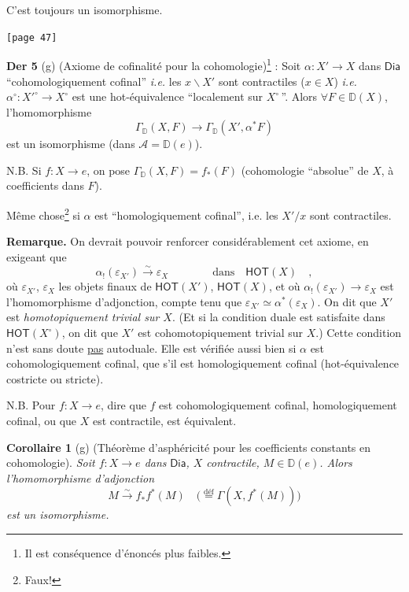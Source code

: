 \documentclass[11pt]{article}
\newcommand{\printedpage}[1]{\marginpar{\footnotesize p.~#1}}
\newcommand{\msp}[1]{\marginpar{\footnotesize [#1]}}
\newcommand{\Dia}{\mathsf{Dia}}
\newcommand{\D}{\mathbb{D}}
\newcommand{\HOT}{\mathsf{HOT}}
\begin{document}
\noindent C'est toujours un isomorphisme.

\noindent\msp{page 47}\texttt{[page 47]}

\noindent\textbf{Der 5} (g) (Axiome de cofinalité pour la cohomologie)\footnote[14]{Il est conséquence d'énoncés plus faibles.} : Soit $\alpha : X' \to X$ dans $\Dia$ “cohomologiquement cofinal” \textit{i.e.} les $x\backslash X'$ sont contractiles ($x \in X$) \textit{i.e.} $\alpha^{\circ} : {X'}^{\circ} \to X^{\circ}$ est une hot-équivalence “localement sur $X^{\circ}$\,”. Alors $\forall F \in \D(X)$, l'homomorphisme
\[ \Gamma_{\D}(X, F) \longrightarrow \Gamma_{\D}(X', \alpha^{*} F) \]
est un isomorphisme (dans $\mathcal{A} = \D(e)$).

\noindent N.B. Si $f : X \to e$, on pose $\Gamma_{\D}(X, F) = f_{*}(F)$ (cohomologie “absolue” de $X$, à coefficients dans $F$).

\noindent Même chose\footnote[15]{Faux!} si $\alpha$ est “homologiquement cofinal”, i.e. les $X'/x$ sont contractiles.


\printedpage{26}

\noindent\textbf{Remarque.} On devrait pouvoir renforcer considérablement cet axiome, en exigeant que
\[ \alpha_{!}(\varepsilon_{X'}) \xrightarrow{\sim} \varepsilon_{X} \qquad\qquad \text{dans} \quad \HOT(X) \quad , \]
où $\varepsilon_{X'}$, $\varepsilon_{X}$ les objets finaux de $\HOT(X')$, $\HOT(X)$, et où $\alpha_{!}(\varepsilon_{X'}) \to \varepsilon_{X}$ est l'homomorphisme d'adjonction, compte tenu que $\varepsilon_{X'} \simeq \alpha^{*}(\varepsilon_{X})$. On dit que $X'$ est \textit{homotopiquement trivial sur $X$}. (Et si la condition duale est satisfaite dans $\HOT(X^{\circ})$, on dit que $X'$ est cohomotopiquement trivial sur $X$.) Cette condition n'est sans doute \underline{pas} autoduale. Elle est vérifiée aussi bien si $\alpha$ est cohomologiquement cofinal, que s'il est homologiquement cofinal (hot-équivalence costricte ou stricte).

\noindent N.B. Pour $f : X \to e$, dire que $f$ est cohomologiquement cofinal, homologiquement cofinal, ou que $X$ est contractile, est équivalent.

\noindent\textbf{Corollaire 1} (g) (Théorème d'asphéricité pour les coefficients constants en cohomologie). \textit{Soit $f : X \to e$ dans} $\Dia$\textit{, $X$ contractile, $M \in \D(e)$. Alors l'homomorphisme d'adjonction}
\[ M \xrightarrow{\sim} f_{*} f^{*}(M) \quad \bigl(\overset{\text{déf}}{=} \Gamma(X, f^{*}(M))\bigr) \]
\textit{est un isomorphisme.}
\end{document}
